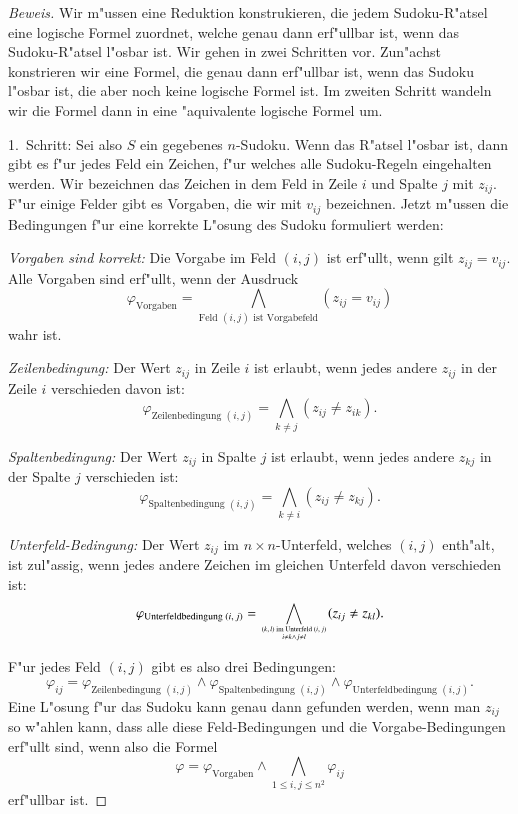 \begin{proof}[Beweis]
Wir m"ussen eine Reduktion konstrukieren, die jedem Sudoku-R"atsel
eine logische Formel zuordnet, welche genau dann erf"ullbar ist, wenn
das Sudoku-R"atsel l"osbar ist. Wir gehen in zwei Schritten vor. 
Zun"achst konstrieren wir eine Formel, die genau dann erf"ullbar ist,
wenn das Sudoku l"osbar ist, die aber noch keine logische Formel ist.
Im zweiten Schritt wandeln wir die Formel dann in eine "aquivalente
logische Formel um.

1.~Schritt: Sei also $S$ ein gegebenes $n$-Sudoku. Wenn das R"atsel l"osbar
ist, dann gibt es f"ur jedes Feld ein Zeichen, f"ur welches alle Sudoku-Regeln
eingehalten werden. Wir bezeichnen das Zeichen in dem Feld in Zeile $i$
und Spalte $j$ mit $z_{ij}$. F"ur einige Felder gibt es Vorgaben, die wir mit
$v_{ij}$ bezeichnen. Jetzt m"ussen die Bedingungen f"ur eine korrekte
L"osung des Sudoku formuliert werden:
\begin{compactenum}
\item {\em Vorgaben sind korrekt:} Die Vorgabe im Feld $(i,j)$ ist erf"ullt,
wenn gilt $z_{ij}=v_{ij}$. Alle Vorgaben sind erf"ullt, wenn der Ausdruck
\[
\varphi_{\text{Vorgaben}}=\bigwedge_{\text{Feld $(i,j)$ ist Vorgabefeld}}(z_{ij}=v_{ij})
\]
wahr ist.
\item {\em Zeilenbedingung:} Der Wert $z_{ij}$ in Zeile $i$ ist erlaubt,
wenn jedes andere $z_{ij}$ in der Zeile $i$ verschieden davon ist:
\[
\varphi_{\text{Zeilenbedingung $(i,j)$}}
=
\bigwedge_{k\ne j}(z_{ij}\ne z_{ik}).
\]
\item {\em Spaltenbedingung:} Der Wert $z_{ij}$ in Spalte $j$ ist erlaubt,
wenn jedes andere $z_{kj}$ in der Spalte $j$ verschieden ist:
\[
\varphi_{\text{Spaltenbedingung $(i,j)$}}
=
\bigwedge_{k\ne i}(z_{ij}\ne z_{kj}).
\]
\item {\em Unterfeld-Bedingung:} Der Wert $z_{ij}$ im $n\times n$-Unterfeld,
welches $(i,j)$ enth"alt, ist zul"assig, wenn jedes andere Zeichen im gleichen
Unterfeld davon verschieden ist:
\[
\varphi_
{\text{Unterfeldbedingung $(i,j)$}}
=
\bigwedge_{{\text{$(k,l)$ im Unterfeld $(i,j)$}}\atop{i\ne k\wedge j\ne l}}(z_{ij}\ne z_{kl}).
\]
\end{compactenum}
F"ur jedes Feld $(i,j)$ gibt es also drei Bedingungen:
\[
\varphi_{ij}=
\varphi_{\text{Zeilenbedingung $(i,j)$}}
\wedge
\varphi_{\text{Spaltenbedingung $(i,j)$}}
\wedge
\varphi_{\text{Unterfeldbedingung $(i,j)$}}.
\]
Eine L"osung f"ur das Sudoku kann genau dann gefunden werden, wenn man
$z_{ij}$ so w"ahlen kann, dass alle diese Feld-Bedingungen und die
Vorgabe-Bedingungen erf"ullt sind, wenn also die Formel
\begin{equation}
\varphi=
\varphi_{\text{Vorgaben}}\wedge
\bigwedge_{1\le i,j\le n^2}
\varphi_{ij}
\label{sudoku-formel}
\end{equation}
erf"ullbar ist.


\end{proof}
